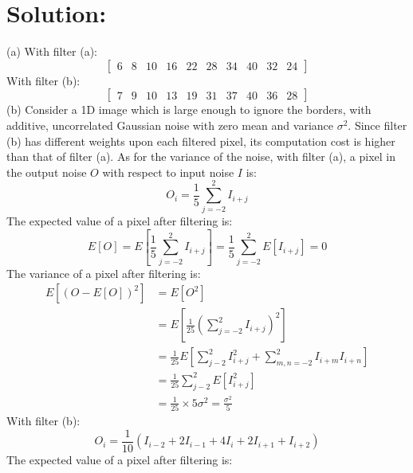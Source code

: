 \documentclass[12pt]{article}
\begin{document}
\section{Solution:}
(a) With filter (a): 
\begin{equation*}
{\left[ \begin{array}{cccccccccc}
6 & 8 & 10 & 16 & 22 & 28 & 34&  40 &  32& 24
\end{array} \right]}
\end{equation*}
\noindent With filter (b):
\begin{equation*}
{\left[ \begin{array}{cccccccccc}
7 & 9 & 10 & 13 & 19 & 31 & 37 & 40 & 36 & 28
\end{array} \right]}
\end{equation*}
\noindent (b) Consider a 1D image which is large enough to ignore the borders, with additive, uncorrelated Gaussian noise with zero mean and variance $\sigma^2$. Since filter (b) has different weights upon each filtered pixel, its computation cost is higher than that of filter (a). As for the variance of the noise, with filter (a), a pixel in the output noise $O$ with respect to input noise $I$ is:
\begin{equation*}
O_i = \frac{1}{5}\sum^2_{j = -2}I_{i+j}
\end{equation*}
The expected value of a pixel after filtering is:
\begin{equation*}
E[O] = E\left[\frac{1}{5}\sum^2_{j = -2}I_{i+j}\right] = \frac{1}{5}\sum^2_{j=-2}E\left[I_{i+j}\right] = 0
\end{equation*}
The variance of a pixel after filtering is:
\begin{equation*}
\begin{aligned}
E[(O-E[O])^2] &= E[O^2] \\
&= E\left[\frac{1}{25}\left(\sum^2_{j = -2}I_{i+j}\right)^2\right]\\
&= \frac{1}{25}E\left[\sum^2_{j-2}I^2_{i+j} + \sum^2_{m,n = -2}I_{i+m}I_{i+n}\right]\\
&= \frac{1}{25}\sum^2_{j-2}E\left[I^2_{i+j}\right]\\
&=\frac{1}{25}\times5\sigma^2 = \frac{\sigma^2}{5}
\end{aligned}
\end{equation*}
With filter (b):
\begin{equation*}
O_i = \frac{1}{10}\left(I_{i-2} + 2I_{i-1} + 4I_{i} + 2I_{i+1} + I_{i+2}\right)
\end{equation*}
The expected value of a pixel after filtering is:
\end{document}

